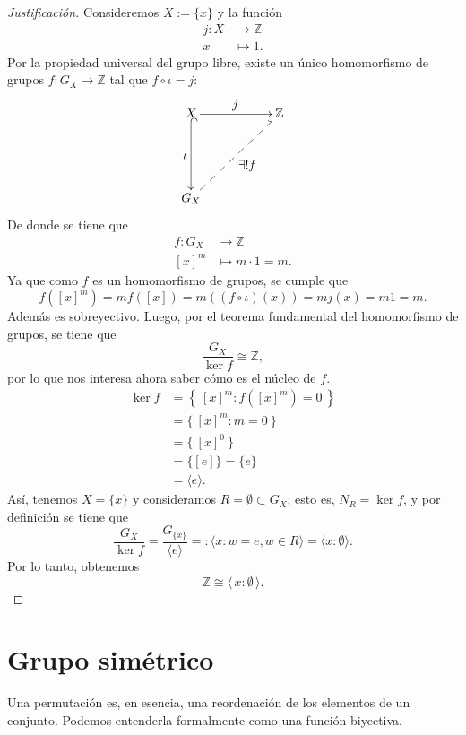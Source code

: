 \begin{proof}[Justificación]
	Consideremos \( X := \{x\} \) y la función 
	\begin{align*}
		j : X &\longrightarrow \mathbb{Z}\\[4pt]
		x &\longmapsto 1.
	\end{align*}
	Por la propiedad universal del grupo libre, existe un único homomorfismo de grupos \( f : G_X \to \mathbb{Z} \) tal que \( f \circ \iota = j \):
	\[
	\xymatrix{
		X \ar[rr]^{\displaystyle j} \ar@{^(->}[dd]_{\displaystyle \iota } & & \mathbb{Z} \\
		&&\\
		G_X \ar@{-->}[rruu]_{\displaystyle \exists !f} &&
	}
	\]	
	De donde se tiene que 
	\begin{align*}
		f : G_X &\longrightarrow \mathbb{Z} \\[4pt]
		[x]^m &\longmapsto m \cdot 1 = m.
	\end{align*}	
	Ya que como \( f \) es un homomorfismo de grupos, se cumple que 
	\[
	f\left([x]^m\right) = m f\left([x]\right) = m\left((f\circ \iota)(x)\right) = m j(x) =  m1 = m.
	\]Además es sobreyectivo. Luego, por el teorema fundamental del homomorfismo de grupos, se tiene que 
	\[
	\dfrac{G_{X}}{\ker f} \cong \mathbb{Z},
	\]
	por lo que nos interesa ahora saber cómo es el núcleo de \( f \). 
	\begin{align*}
		\ker f &= \left\{\:[x]^m : f([x]^m) = 0\:\right\}\\[4pt]
		&= \{\:[x]^m : m = 0\:\}\\[4pt]
		&= \{\:[x]^0 \:\}\\[4pt]
		&=\{[e]\}=\{e\}\\[4pt]
		&= \langle e \rangle.
	\end{align*}	
	Así, tenemos \( X = \{x\} \) y consideramos \( R = \emptyset \subset G_X \); esto es, \( N_R = \ker f \), y por definición se tiene que 	
	\[
	\dfrac{G_{X}}{\ker f} = \dfrac{G_{\{x\}}}{\langle e \rangle} =:\langle x : w=e,w\in R \rangle= \langle x : \emptyset \rangle.
	\] 	Por lo tanto, obtenemos
	\[
	\mathbb{Z} \cong \langle \,x : \emptyset \,\rangle.
	\]
\end{proof}


\section{Grupo simétrico}


Una permutación es, en esencia, una reordenación de los elementos de un conjunto. Podemos entenderla formalmente como una función biyectiva.


